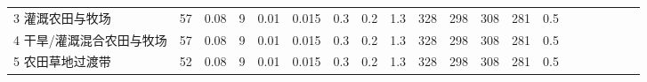 \begin{sidewaystable}[]
\begin{tabular}{@{}lccccccccccccccccccc@{}}
    3 灌溉农田与牧场      & 57                                                                & 0.08                                                                                                   & 9                                                                                  & 0.01                                                                               & 0.015                                                               & 0.3                                                       & 0.2                                                       & 1.3                                                       & 328                                                             & 298                                                             & 308                                                              & 281                                                               & 0.5                                                          \\
    4 干旱/灌溉混合农田与牧场 & 57                                                                & 0.08                                                                                                   & 9                                                                                  & 0.01                                                                               & 0.015                                                               & 0.3                                                       & 0.2                                                       & 1.3                                                       & 328                                                             & 298                                                             & 308                                                              & 281                                                               & 0.5                                                          \\
    5 农田草地过渡带      & 52                                                                & 0.08                                                                                                   & 9                                                                                  & 0.01                                                                               & 0.015                                                               & 0.3                                                       & 0.2                                                       & 1.3                                                       & 328                                                             & 298                                                             & 308                                                              & 281                                                               & 0.5                                                          \\

\end{tabular}
\end{sidewaystable}
